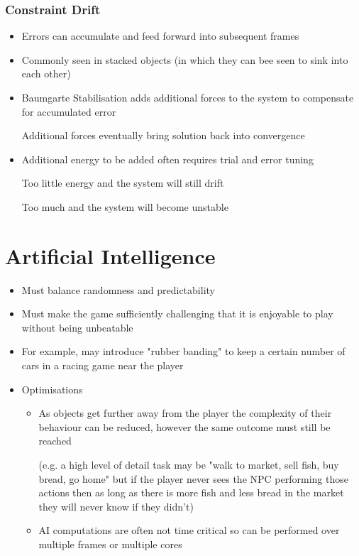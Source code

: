 \documentclass[a4paper]{article}
\begin{document}
\subsubsection{Constraint Drift}

\begin{itemize}
  \item
    Errors can accumulate and feed forward into subsequent frames

  \item
    Commonly seen in stacked objects (in which they can bee seen to sink into
    each other)

  \item
    Baumgarte Stabilisation adds additional forces to the system to compensate
    for accumulated error

    Additional forces eventually bring solution back into convergence

  \item
    Additional energy to be added often requires trial and error tuning

    Too little energy and the system will still drift

    Too much and the system will become unstable

\end{itemize}

\section{Artificial Intelligence}

\begin{itemize}
  \item
    Must balance randomness and predictability

  \item
    Must make the game sufficiently challenging that it is enjoyable to play
    without being unbeatable

  \item
    For example, may introduce "rubber banding" to keep a certain number of cars
    in a racing game near the player

  \item
    Optimisations
    \begin{itemize}
      \item
        As objects get further away from the player the complexity of their
        behaviour can be reduced, however the same outcome must still be reached

        (e.g. a high level of detail task may be "walk to market, sell fish, buy
        bread, go home" but if the player never sees the NPC performing those
        actions then as long as there is more fish and less bread in the market
        they will never know if they didn't)

      \item
        AI computations are often not time critical so can be performed over
        multiple frames or multiple cores

    \end{itemize}

\end{itemize}
\end{document}
